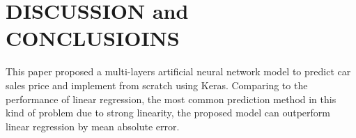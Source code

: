 \documentclass[sigplan,screen]{acmart}
\begin{document}
\section{DISCUSSION and CONCLUSIOINS}
This paper proposed a multi-layers artificial neural network model to predict car sales price and implement from scratch using Keras. Comparing to the performance of linear regression, the most common prediction method in this kind of problem due to strong linearity, the proposed model can outperform linear regression by mean absolute error.


\end{document}
